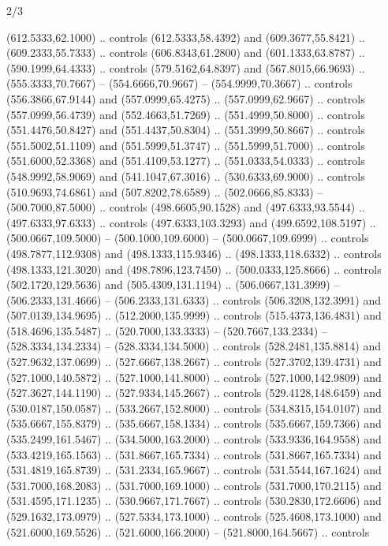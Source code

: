 \begin{flagdescription}{2/3}
\begin{scope}[xshift=0.5\flaglength,yshift=0.5\flagwidth,scale=\flagwidth/525.28]
\begin{scope}[y=0.1mm, x=0.1mm, yscale=-1,shift={(-381.5,-404)}]
\begin{scope}[shift={(5.25001,4.53053)},miter limit=4.00,line width=0.800\lw]
  (612.5333,62.1000) .. controls (612.5333,58.4392) and (609.3677,55.8421) ..
  (609.2333,55.7333) .. controls (606.8343,61.2800) and (601.1333,63.8787) ..
  (590.1999,64.4333) .. controls (579.5162,64.8397) and (567.8015,66.9693) ..
  (555.3333,70.7667) -- (554.6666,70.9667) -- (554.9999,70.3667) .. controls
  (556.3866,67.9144) and (557.0999,65.4275) .. (557.0999,62.9667) .. controls
  (557.0999,56.4739) and (552.4663,51.7269) .. (551.4999,50.8000) .. controls
  (551.4476,50.8427) and (551.4437,50.8304) .. (551.3999,50.8667) .. controls
  (551.5002,51.1109) and (551.5999,51.3747) .. (551.5999,51.7000) .. controls
  (551.6000,52.3368) and (551.4109,53.1277) .. (551.0333,54.0333) .. controls
  (548.9992,58.9069) and (541.1047,67.3016) .. (530.6333,69.9000) .. controls
  (510.9693,74.6861) and (507.8202,78.6589) .. (502.0666,85.8333) --
  (500.7000,87.5000) .. controls (498.6605,90.1528) and (497.6333,93.5544) ..
  (497.6333,97.6333) .. controls (497.6333,103.3293) and (499.6592,108.5197) ..
  (500.0667,109.5000) -- (500.1000,109.6000) -- (500.0667,109.6999) .. controls
  (498.7877,112.9308) and (498.1333,115.9346) .. (498.1333,118.6332) .. controls
  (498.1333,121.3020) and (498.7896,123.7450) .. (500.0333,125.8666) .. controls
  (502.1720,129.5636) and (505.4309,131.1194) .. (506.0667,131.3999) --
  (506.2333,131.4666) -- (506.2333,131.6333) .. controls (506.3208,132.3991) and
  (507.0139,134.9695) .. (512.2000,135.9999) .. controls (515.4373,136.4831) and
  (518.4696,135.5487) .. (520.7000,133.3333) -- (520.7667,133.2334) --
  (528.3334,134.2334) -- (528.3334,134.5000) .. controls (528.2481,135.8814) and
  (527.9632,137.0699) .. (527.6667,138.2667) .. controls (527.3702,139.4731) and
  (527.1000,140.5872) .. (527.1000,141.8000) .. controls (527.1000,142.9809) and
  (527.3627,144.1190) .. (527.9334,145.2667) .. controls (529.4128,148.6459) and
  (530.0187,150.0587) .. (533.2667,152.8000) .. controls (534.8315,154.0107) and
  (535.6667,155.8379) .. (535.6667,158.1334) .. controls (535.6667,159.7366) and
  (535.2499,161.5467) .. (534.5000,163.2000) .. controls (533.9336,164.9558) and
  (533.4219,165.1563) .. (531.8667,165.7334) .. controls (531.8667,165.7334) and
  (531.4819,165.8739) .. (531.2334,165.9667) .. controls (531.5544,167.1624) and
  (531.7000,168.2083) .. (531.7000,169.1000) .. controls (531.7000,170.2115) and
  (531.4595,171.1235) .. (530.9667,171.7667) .. controls (530.2830,172.6606) and
  (529.1632,173.0979) .. (527.5334,173.1000) .. controls (525.4608,173.1000) and
  (521.6000,169.5526) .. (521.6000,166.2000) -- (521.8000,164.5667) .. controls

\end{scope}
\end{scope}
\end{scope}
\end{flagdescription}
